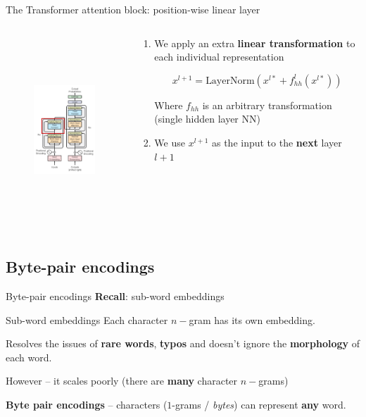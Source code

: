 \documentclass[12pt,aspectratio=169,handout]{beamer}
\newcounter{saveenumi}
\newcommand{\conti}{\setcounter{enumi}{\value{saveenumi}}}
\begin{document}
\begin{frame}{The Transformer attention block: position-wise linear layer}

	\begin{columns}[T]
		\begin{column}{.48\textwidth}
	
			\begin{figure}[h]
				\includegraphics[height=7cm]{anno_trf_hllinear.png}
			\end{figure}
			\end{column}
			\begin{column}{.48\textwidth}
				\begin{enumerate}
					\conti
					\item We apply an extra \textbf{linear transformation} to each individual representation
				
					$$
						x^{l+1} = \text{LayerNorm} (x^{l*} + f^l_{hh} (x^{l*}))   
					$$

					Where $f_{hh}$ is an arbitrary transformation (single hidden layer NN)

					\item We use $x^{l+1}$ as the input to the \textbf{next} layer $l+1$
				\end{enumerate}
			\end{column}
		\end{columns}

\end{frame}

\subsection{Byte-pair encodings}

\begin{frame}{Byte-pair encodings}
	\textbf{Recall}: sub-word embeddings

	\begin{block}{Sub-word embeddings}
		Each character $n-$gram has its own embedding.

		Resolves the issues of \textbf{rare words}, \textbf{typos} and doesn't ignore the \textbf{morphology} of each word.

		However -- it scales poorly (there are \textbf{many} character $n-$grams)
	\end{block}

	\pause

	\textbf{Byte pair encodings} -- characters ($1$-grams / \textit{bytes}) can represent \textbf{any} word.


\end{frame}
\end{document}
